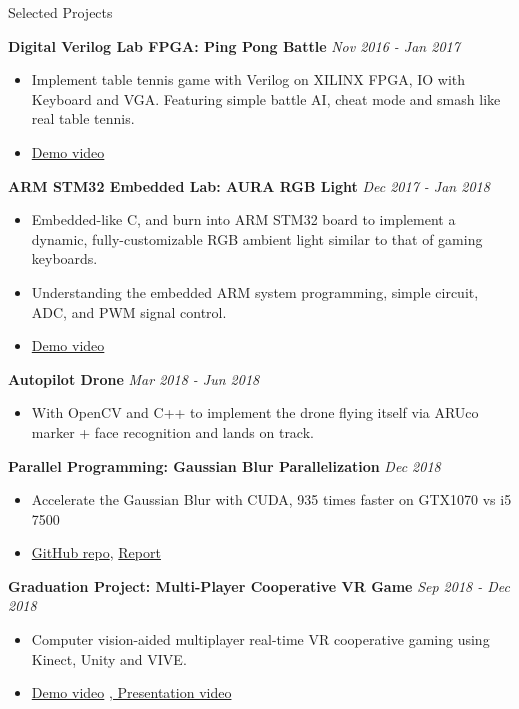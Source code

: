 \documentclass{resume} %
\begin{document}
\begin{rSection}{Selected Projects}

{\bf Digital Verilog Lab FPGA: Ping Pong Battle} \hfill {\em Nov 2016 - Jan 2017}
\begin{itemize}
    \item Implement table tennis game with Verilog on XILINX FPGA, IO with Keyboard and VGA. Featuring simple battle AI, cheat mode and smash like real table tennis.
    \item \href{https://www.youtube.com/watch?v=R4cgMN5uRBE}{Demo video}
\end{itemize}

{\bf ARM STM32 Embedded Lab: AURA RGB Light } \hfill {\em Dec 2017 - Jan 2018}
\begin{itemize}
    \item Embedded-like C, and burn into ARM STM32 board to implement a dynamic, fully-customizable RGB ambient light similar to that of gaming keyboards. 
    \item Understanding the embedded ARM system programming, simple circuit, ADC, and PWM signal control.
    \item \href{https://www.youtube.com/watch?v=FdnTKmdjxIc}{Demo video}
\end{itemize}

{\bf Autopilot Drone} \hfill {\em Mar 2018 - Jun 2018}
\begin{itemize}
\item With OpenCV and C++ to implement the drone flying itself via ARUco marker + face recognition and lands on track.
\end{itemize}

{\bf Parallel Programming: Gaussian Blur Parallelization} \hfill {\em Dec 2018}
\begin{itemize}
    \item Accelerate the Gaussian Blur with CUDA, 935 times faster on GTX1070 vs i5 7500
    \item \href{https://github.com/Alfons0329/Parallel_Programming_Fall_2018/tree/master/Final\%20Project}{GitHub repo}, \href{https://github.com/Alfons0329/Parallel_Programming_Fall_2018/blob/master/Final\%20Project/Team24_Final_Project_Report.pdf}{Report}
\end{itemize}

{\bf Graduation Project: Multi-Player Cooperative VR Game} \hfill {\em Sep 2018 - Dec 2018}
\begin{itemize}
    \item Computer vision-aided multiplayer real-time VR cooperative gaming using Kinect, Unity and VIVE.
    \item \href{https://www.youtube.com/watch?v=rYiFose7gZU}{Demo video} \href{https://youtu.be/Kfz1KYMKrtU}{, Presentation video}
\end{itemize}
\end{rSection}
\end{document}
